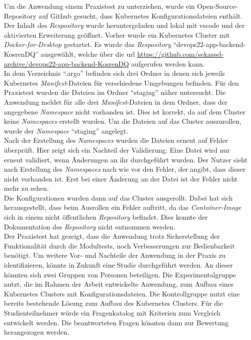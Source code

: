 Um die Anwendung einem Praxistest zu unterziehen, wurde ein Open-Source-Repository auf Github gesucht, dass Kubernetes Konfigurationsdateien
enthält. Der Inhalt des \textit{Respository} wurde heruntergeladen und lokal mit \ac{vscode} und der aktivierten Erweiterung geöffnet.
Vorher wurde ein Kubernetes Cluster mit \textit{Docker-for-Desktop} gestartet.
Es wurde das \textit{Respository} ``devops22-app-backend-KosrenDQ'' ausgewählt, welche über
die \ac{url} \url{https://github.com/sekassel-archive/devops22-app-backend-KosrenDQ} aufgerufen werden kann.
\\
In dem Verzeichnis ``.argo'' befinden sich drei Ordner in denen sich jeweils Kubernetes \textit{Manifest}-Dateien für verschiedene
Umgebungen befinden. Für den Praxistest wurden die Dateien im Ordner ``staging'' näher untersucht.
Die Anwendung meldet für alle drei \textit{Manifest}-Dateien in dem Ordner, dass der angegebene \textit{Namespace} nicht vorhanden ist.
Dies ist korrekt, da auf dem Cluster keine \textit{Namespaces} erstellt wurden. Um die Dateien auf das Cluster auszurollen, wurde
der \textit{Namespace} ``staging'' angelegt.
\\
Nach der Erstellung des \textit{Namespaces} wurden die Dateien erneut auf Fehler überprüft. Hier zeigt sich ein Nachteil der
Validierung. Eine Datei wird nur erneut validiert, wenn Änderungen an ihr durchgeführt wurden.
Der Nutzer sieht nach Erstellung des \textit{Namespaces} nach wie vor den Fehler, der angibt, dass dieser nicht vorhanden ist.
Erst bei einer Änderung an der Datei ist der Fehler nicht mehr zu sehen.
\\
Die Konfigurationen wurden dann auf das Cluster ausgerollt. Dabei hat sich herausgestellt, dass beim Ausrollen
ein Fehler auftritt, da das \textit{Container-Image} sich in einem nicht öffentlichen \textit{Repository} befindet.
Dies konnte der Dokumentation des \textit{Repository} nicht entnommen werden.
\\
Der Praxistest hat gezeigt, dass die Anwendung trotz Sicherstellung der Funktionalität durch die Modultests, noch Verbesserungen
zur Bedienbarkeit benötigt.
Um weitere Vor- und Nachteile der Anwendung in der Praxis zu identifizieren, könnte in Zukunft eine Studie durchgeführt werden.
An dieser könnten sich zwei Gruppen von Personen beteiligen.
Die Experimentalgruppe nutzt, die im Rahmen der Arbeit entwickelte Anwendung, zum Aufbau eines Kubernetes Clusters
mit Konfigurationsdateien. Die Kontrollgruppe nutzt eine bereits bestehende Lösung zum Aufbau des Kubernetes Clusters.
Für die Studienteilnehmer würde ein Fragenkatalog mit Kriterien zum Vergleich entwickelt werden.
Die beantworteten Fragen könnten dann zur Bewertung herangezogen werden.